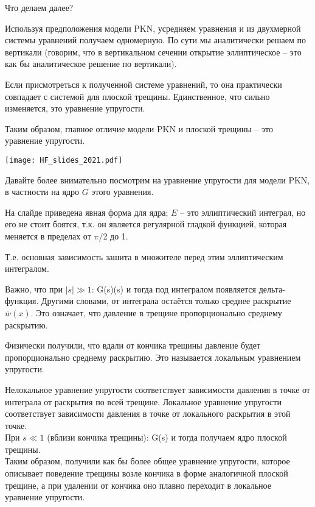 \documentclass[main.tex]{subfiles}
\begin{document}
Что делаем далее?

Используя предположения модели PKN, усредняем уравнения и из двухмерной системы уравнений получаем одномерную.
По сути мы аналитически решаем по вертикали (говорим, что в вертикальном сечении открытие эллиптическое -- это как бы аналитическое решение по вертикали).

Если присмотреться к полученной системе уравнений, то она практически совпадает с системой для плоской трещины.
Единственное, что сильно изменяется, это уравнение упругости.

Таким образом, главное отличие модели PKN и плоской трещины -- это уравнение упругости.

\texttt{[image: HF\_slides\_2021.pdf]}

Давайте более внимательно посмотрим на уравнение упругости для модели PKN, в частности на ядро $G$ этого уравнения.

На слайде приведена явная форма для ядра; $E$ -- это эллиптический интеграл, но его не стоит боятся, т.к. он является регулярной гладкой функцией, которая меняется в пределах от $\pi$/2 до 1.

Т.е. основная зависимость зашита в множителе перед этим эллиптическим интегралом.

Важно, что при $\left|s\right|\gg 1$:
\beq
G(s)\approx{}(s)
\eeq
и тогда под интегралом появляется дельта-функция.
Другими словами, от интеграла остаётся только среднее раскрытие $\bar{w}(x)$.
Это означает, что давление в трещине пропорционально среднему раскрытию.

Физически получили, что вдали от кончика трещины давление будет пропорционально среднему раскрытию.
Это называется локальным уравнением упругости.

Нелокальное уравнение упругости соответствует зависимости давления в точке от интеграла от раскрытия по всей трещине.
Локальное уравнение упругости соответствует зависимости давления в точке от локального раскрытия в этой точке.
\\

При $s\ll1$ (вблизи кончика трещины):
\beq
G(s)\approx{}
\eeq
и тогда получаем ядро плоской трещины.
\\

Таким образом, получили как бы более общее уравнение упругости, которое описывает поведение трещины возле кончика в форме аналогичной плоской трещине, а при удалении от кончика оно плавно переходит в локальное уравнение упругости.
\end{document}
